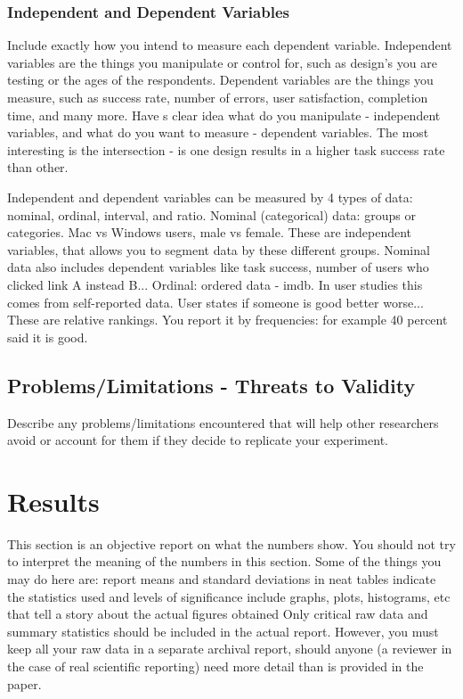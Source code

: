\subsubsection{Independent and Dependent Variables}
Include exactly how you intend to measure each dependent variable. 
Independent variables are the things you manipulate or control for, such as design's you are testing or the ages of the respondents. 
Dependent variables are the things you measure, such as success rate, number of errors, user satisfaction, completion time, and many more. Have s clear idea what do you manipulate - independent variables, and what do you want to measure - dependent variables. The most interesting is the intersection - is one design results in a higher task success rate than other. 

Independent and dependent variables can be measured by 4 types of data: nominal, ordinal, interval, and ratio. 
Nominal (categorical) data: groups or categories. Mac vs Windows users, male vs female. These are independent variables, that allows you to segment data by these different groups. Nominal data also includes dependent variables like task success, number of users who clicked link A instead B... 
Ordinal: ordered data - imdb. In user studies this comes from self-reported data. User states if someone is good better worse... These are relative rankings. You report it by frequencies: for example 40 percent said it is good. 

\subsection{Problems/Limitations - Threats to Validity}
Describe any problems/limitations encountered that will help other researchers avoid or account for them if they decide to replicate your experiment.
\section{Results}

This section is an objective report on what the numbers show. You should not try to interpret the meaning of the numbers in this section. Some of the things you may do here are: 
report means and standard deviations in neat tables 
indicate the statistics used and levels of significance 
include graphs, plots, histograms, etc that tell a story about the actual figures obtained 
Only critical raw data and summary statistics should be included in the actual report. However, you must keep all your raw data in a separate archival report, should anyone (a reviewer in the case of real scientific reporting) need more detail than is provided in the paper. 
